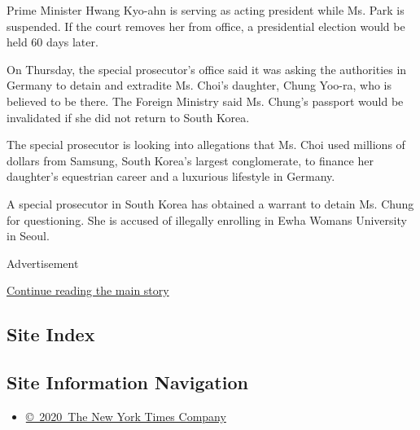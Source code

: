 Prime Minister Hwang Kyo-ahn is serving as acting president while Ms.
Park is suspended. If the court removes her from office, a presidential
election would be held 60 days later.

On Thursday, the special prosecutor's office said it was asking the
authorities in Germany to detain and extradite Ms. Choi's daughter,
Chung Yoo-ra, who is believed to be there. The Foreign Ministry said Ms.
Chung's passport would be invalidated if she did not return to South
Korea.

The special prosecutor is looking into allegations that Ms. Choi used
millions of dollars from Samsung, South Korea's largest conglomerate, to
finance her daughter's equestrian career and a luxurious lifestyle in
Germany.

A special prosecutor in South Korea has obtained a warrant to detain Ms.
Chung for questioning. She is accused of illegally enrolling in Ewha
Womans University in Seoul.

Advertisement

\protect\hyperlink{after-bottom}{Continue reading the main story}

\hypertarget{site-index}{%
\subsection{Site Index}\label{site-index}}

\hypertarget{site-information-navigation}{%
\subsection{Site Information
Navigation}\label{site-information-navigation}}

\begin{itemize}
\tightlist
\item
  \href{https://help.nytimes3xbfgragh.onion/hc/en-us/articles/115014792127-Copyright-notice}{©~2020~The
  New York Times Company}
\end{itemize}

